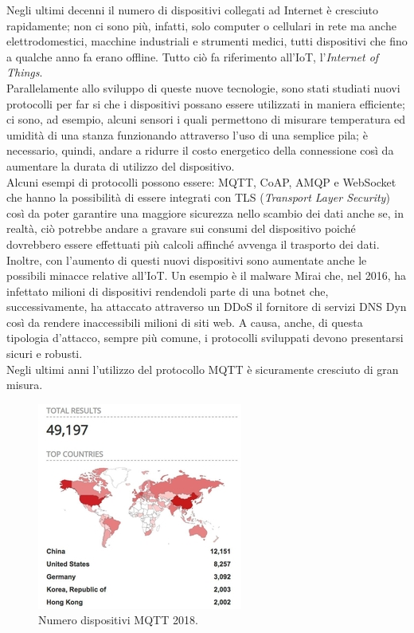 \documentclass[binding=0.6cm,TFA]{sapthesis}
\begin{document}
\begin{large}
Negli ultimi decenni il numero di dispositivi collegati ad Internet è cresciuto rapidamente; non ci sono più, infatti, solo computer o cellulari in rete ma anche elettrodomestici, macchine industriali e strumenti medici, tutti dispositivi che fino a qualche anno fa erano offline. Tutto ciò fa riferimento all'IoT, l'\textit{Internet of Things}. \\
Parallelamente allo sviluppo di queste nuove tecnologie, sono stati studiati nuovi protocolli per far si che i dispositivi possano essere utilizzati in maniera efficiente; ci sono, ad esempio, alcuni sensori i quali permettono di misurare temperatura ed umidità di una stanza funzionando attraverso l'uso di una semplice pila; è necessario, quindi, andare a ridurre il costo energetico della connessione così da aumentare la durata di utilizzo del dispositivo. \\
Alcuni esempi di protocolli possono essere: MQTT, CoAP, AMQP e WebSocket che hanno la possibilità di essere integrati con TLS (\textit{Transport Layer Security}) così da poter garantire una maggiore sicurezza nello scambio dei dati anche se, in realtà, ciò potrebbe andare a gravare sui consumi del dispositivo poiché dovrebbero essere effettuati più calcoli affinché avvenga il trasporto dei dati. Inoltre, con l'aumento di questi nuovi dispositivi sono aumentate anche le possibili minacce relative all'IoT. Un esempio è il malware Mirai \cite{wiki:Mirai} che, nel 2016, ha infettato milioni di dispositivi rendendoli parte di una botnet che, successivamente, ha attaccato attraverso un DDoS il fornitore di servizi DNS Dyn così da rendere inaccessibili milioni di siti web. A causa, anche, di questa tipologia d'attacco, sempre più comune, i protocolli sviluppati devono presentarsi sicuri e robusti.\\

Negli ultimi anni l'utilizzo del protocollo MQTT è sicuramente cresciuto di gran misura.
\begin{figure}[h]
\centering
\includegraphics[scale=0.8]{images/mqtt-2018numbers.jpg}
\caption{Numero dispositivi MQTT 2018.}
\label{fig:mqtt2018}
\end{figure}


\end{large}
\end{document}

